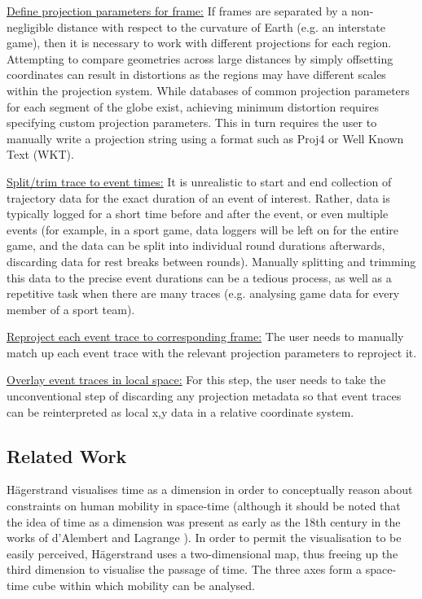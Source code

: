 \ul{Define projection parameters for frame:} If frames are separated by a non-negligible distance with respect to the curvature of Earth (e.g. an interstate game), then it is necessary to work with different projections for each region. Attempting to compare geometries across large distances by simply offsetting coordinates can result in distortions as the regions may have different scales within the projection system. While databases of common projection parameters for each segment of the globe exist, achieving minimum distortion requires specifying custom projection parameters. This in turn requires the user to manually write a projection string using a format such as Proj4 or Well Known Text (WKT).

\ul{Split/trim trace to event times:} It is unrealistic to start and end collection of trajectory data for the exact duration of an event of interest. Rather, data is typically logged for a short time before and after the event, or even multiple events (for example, in a sport game, data loggers will be left on for the entire game, and the data can be split into individual round durations afterwards, discarding data for rest breaks between rounds). Manually splitting and trimming this data to the precise event durations can be a tedious process, as well as a repetitive task when there are many traces (e.g. analysing game data for every member of a sport team).

\ul{Reproject each event trace to corresponding frame:} The user needs to manually match up each event trace with the relevant projection parameters to reproject it.

\ul{Overlay event traces in local space:} For this step, the user needs to take the unconventional step of discarding any projection metadata so that event traces can be reinterpreted as local x,y data in a relative coordinate system.


\subsection{Related Work}

H\"{a}gerstrand visualises time as a dimension in order to conceptually reason about constraints on human mobility in space-time \cite{hagerstrand_what_1970} (although it should be noted that the idea of time as a dimension was present as early as the 18th century in the works of d'Alembert and Lagrange \cite{archibald_time_1914, goenner_history_2008}). In order to permit the visualisation to be easily perceived, H\"{a}gerstrand uses a two-dimensional map, thus freeing up the third dimension to visualise the passage of time. The three axes form a space-time cube within which mobility can be analysed.

